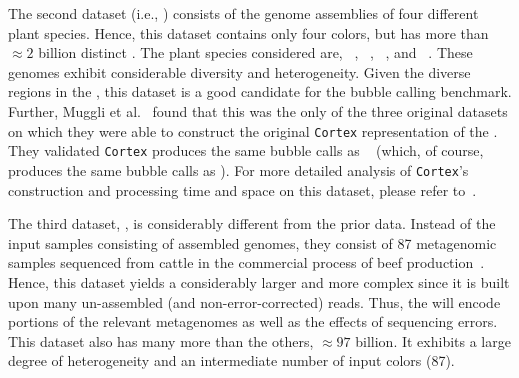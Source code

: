 The second dataset (i.e., \plant) consists of the genome assemblies of four
different plant species. Hence, this dataset contains only four colors, but has
more than $\approx2$ billion distinct \kmers. The plant species considered are,
~\cite{swarbreck2008arabidopsis},
~\cite{schnable2009b73},
~\cite{tanaka2008rice},
and
~\cite{causse2013whole}.
%
These genomes exhibit considerable diversity and heterogeneity. Given the
diverse regions in the \cdbg, this dataset is a good candidate for the bubble
calling benchmark. Further, Muggli et al.~\cite{MuggliBoNo17} found that this
was the only of the three original datasets on which they were able to construct
the original \texttt{Cortex} representation of the \cdbg. They validated
\texttt{Cortex} produces the same bubble calls as \vari ~\cite{MuggliBoNo17}
(which, of course, produces the same bubble calls as \rainbowfish).
%
For more detailed analysis of \texttt{Cortex}'s construction and processing time
and space on this dataset, please refer to~\cite{MuggliBoNo17}.
%
%

The third dataset, \beefsafety, is considerably different from the prior data.
Instead of the input samples consisting of assembled genomes, they consist of
87 metagenomic samples sequenced from cattle in the commercial process of beef
production~\cite{noyes2016resistome}. Hence, this dataset yields a considerably
larger and more complex \dbg since it is built upon many un-assembled (and
non-error-corrected) reads. Thus, the \dbg will encode portions of the relevant
metagenomes as well as the effects of sequencing errors. This dataset also has
many more \kmers than the others, $\approx97$ billion. It exhibits a large
degree of heterogeneity and an intermediate number of input colors (87).
%
%


